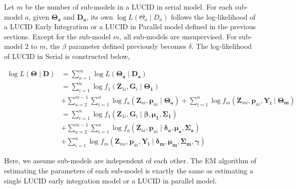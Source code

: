 Let \(m\) be the number of sub-models in a LUCID in serial model. For each
sub-model \(a\), given \(\boldsymbol{\mathbf{\Theta_a}}\) and
\(\boldsymbol{\mathbf{D_a}}\), its own \(\log L({\Theta_a} \mid {D_a})\)
follows the log-likelihood of a LUCID Early Integration or a LUCID in
Parallel model defined in the previous sections. Except for the
sub-model \(m\), all sub-models are unsupervised. For sub-model 2 to \(m\),
the \(\beta\) parameter defined previously becomes \(\delta\). The
log-likelihood of LUCID in Serial is constructed below,

\[\begin{aligned}
         \log L(\boldsymbol{\mathbf{\Theta}}\mid \boldsymbol{D}) & = \sum_{a = 1}^m \log L(\boldsymbol{\mathbf{\Theta_a}}\mid \boldsymbol{\mathbf{D_a}}) \\ &
         = \sum_{i = 1}^n \log f_1(\boldsymbol{\mathbf{Z}}_{1i}, \boldsymbol{\mathbf{G}}_i \mid \boldsymbol{\mathbf{\Theta_1}}) \\ &
         + \sum_{a = 2}^{m-1} \sum_{i = 1}^n \log f_a(\boldsymbol{\mathbf{Z}}_{ai}, \boldsymbol{\mathbf{p}}_{ai} \mid \boldsymbol{\mathbf{\Theta_a}}) + \sum_{i = 1}^n \log f_m(\boldsymbol{\mathbf{Z}}_{mi}, \boldsymbol{\mathbf{p}}_{ai}, \boldsymbol{\mathbf{Y_i}} \mid \boldsymbol{\mathbf{\Theta_m}}) \\ &
         = \sum_{i = 1}^n \log f_1(\boldsymbol{\mathbf{Z}}_{1i}, \boldsymbol{\mathbf{G}}_i \mid \boldsymbol{\mathbf{\beta}}, \boldsymbol{\mathbf{\mu_1}}, \boldsymbol{\mathbf{\Sigma_1}}) \\ &
         + \sum_{a = 2}^{m-1} \sum_{i = 1}^n \log f_a(\boldsymbol{\mathbf{Z}}_{ai}, \boldsymbol{\mathbf{p}}_{ai} \mid \boldsymbol{\mathbf{\delta_a}}, \boldsymbol{\mathbf{\mu_a}}, \boldsymbol{\mathbf{\Sigma_a}}) \\ &
         + \sum_{i = 1}^n \log f_m(\boldsymbol{\mathbf{Z}}_{mi}, \boldsymbol{\mathbf{p}}_{ai}, \boldsymbol{\mathbf{Y_i}} \mid \boldsymbol{\mathbf{\delta_m}}, \boldsymbol{\mathbf{\mu_m}}, \boldsymbol{\mathbf{\Sigma_m}}, \boldsymbol{\mathbf{\gamma}})
    \end{aligned}
    \label{eq_27}   \label{eq:eq-27}\]

Here, we assume sub-models are independent of each other. The EM
algorithm of estimating the parameters of each sub-model is exactly the
same as estimating a single LUCID early integration model or a LUCID in
parallel model.

